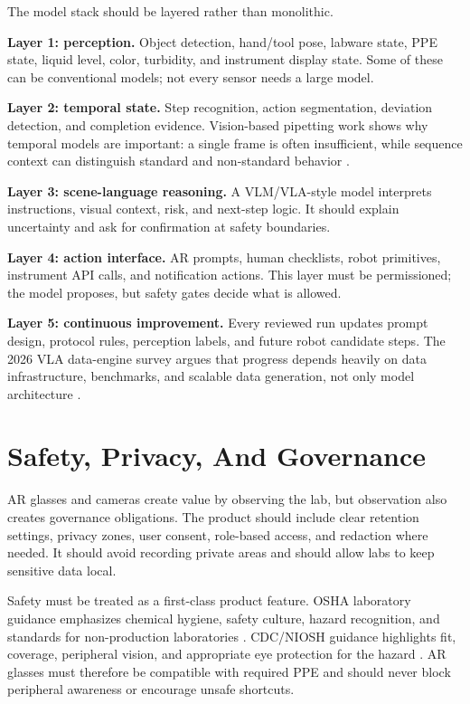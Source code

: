 \documentclass[11pt]{article}
\begin{document}
The model stack should be layered rather than monolithic.

\textbf{Layer 1: perception.} Object detection, hand/tool pose, labware state, PPE state, liquid level, color, turbidity, and instrument display state. Some of these can be conventional models; not every sensor needs a large model.

\textbf{Layer 2: temporal state.} Step recognition, action segmentation, deviation detection, and completion evidence. Vision-based pipetting work shows why temporal models are important: a single frame is often insufficient, while sequence context can distinguish standard and non-standard behavior \cite{guo2026pipetting}.

\textbf{Layer 3: scene-language reasoning.} A VLM/VLA-style model interprets instructions, visual context, risk, and next-step logic. It should explain uncertainty and ask for confirmation at safety boundaries.

\textbf{Layer 4: action interface.} AR prompts, human checklists, robot primitives, instrument API calls, and notification actions. This layer must be permissioned; the model proposes, but safety gates decide what is allowed.

\textbf{Layer 5: continuous improvement.} Every reviewed run updates prompt design, protocol rules, perception labels, and future robot candidate steps. The 2026 VLA data-engine survey argues that progress depends heavily on data infrastructure, benchmarks, and scalable data generation, not only model architecture \cite{vlasurvey2026}.

\section{Safety, Privacy, And Governance}

AR glasses and cameras create value by observing the lab, but observation also creates governance obligations. The product should include clear retention settings, privacy zones, user consent, role-based access, and redaction where needed. It should avoid recording private areas and should allow labs to keep sensitive data local.

Safety must be treated as a first-class product feature. OSHA laboratory guidance emphasizes chemical hygiene, safety culture, hazard recognition, and standards for non-production laboratories \cite{oshaLabs}. CDC/NIOSH guidance highlights fit, coverage, peripheral vision, and appropriate eye protection for the hazard \cite{nioshEye}. AR glasses must therefore be compatible with required PPE and should never block peripheral awareness or encourage unsafe shortcuts.
\end{document}
